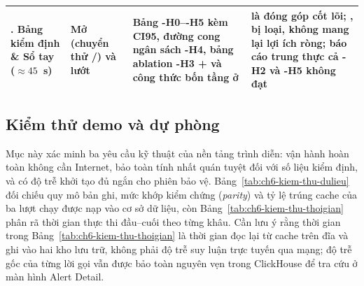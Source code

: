 \begin{table}[H]
\begin{tabularx}{\linewidth}{|>{\raggedright\arraybackslash}p{2.4cm}|>{\raggedright\arraybackslash}p{3.8cm}|Y|>{\raggedright\arraybackslash}p{3.3cm}|}
    . Bảng kiểm định \& Sổ tay ($\approx 45$~s) & Mở  (chuyển thử /) và lướt  & Bảng \hyp{H0}--\hyp{H5} kèm CI95, đường cong ngân sách \hyp{H4}, bảng ablation \hyp{H3} +  và công thức bốn tầng ở  &  là đóng góp cốt lõi; ,  bị loại,  không mang lại lợi ích ròng; báo cáo trung thực cả \hyp{H2} và \hyp{H5} không đạt \\
    \hline
  \end{tabularx}
\end{table}

\subsection{Kiểm thử demo và dự phòng}
\label{sec:ch6-kiem-thu}

Mục này xác minh ba yêu cầu kỹ thuật của nền tảng trình diễn: vận hành hoàn toàn không cần Internet, bảo toàn tính nhất quán tuyệt đối với số liệu kiểm định, và có độ trễ khởi tạo đủ ngắn cho phiên bảo vệ. Bảng~\ref{tab:ch6-kiem-thu-dulieu} đối chiếu quy mô bản ghi, mức khớp kiểm chứng (\emph{parity}) và tỷ lệ trúng cache của ba lượt chạy được nạp vào cơ sở dữ liệu, còn Bảng~\ref{tab:ch6-kiem-thu-thoigian} phân rã thời gian thực thi đầu--cuối theo từng khâu. Cần lưu ý rằng thời gian trong Bảng~\ref{tab:ch6-kiem-thu-thoigian} là thời gian đọc lại từ cache trên đĩa và ghi vào hai kho lưu trữ, không phải độ trễ suy luận trực tuyến qua mạng; độ trễ gốc của từng lời gọi  vẫn được bảo toàn nguyên vẹn trong ClickHouse để tra cứu ở màn hình Alert Detail.


